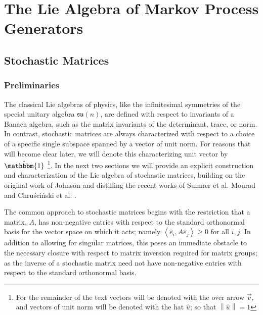 \chapter{The Lie Algebra of Markov Process Generators}
\section{Stochastic Matrices}
\subsection{Preliminaries}
The classical Lie algebras of physics, like the infinitesimal symmetries of the special
unitary algebra $\mathfrak{su}(n)$, are defined with respect to invariants of a Banach
algebra, such as the matrix invariants of the determinant, trace, or norm. In contrast,
stochastic matrices are always characterized with respect to a choice of a specific single
subspace spanned by a vector of unit norm. For reasons that will become clear later, we will
denote this characterizing unit vector by $\hat{\mathbbm{1}}$
\footnote{For the remainder of the text vectors will be denoted with the over arrow $\vec{v}$, and vectors of unit norm will be denoted with the hat $\hat{u}$; so that $\left\| \hat{u} \right\| = 1$}. In the next two sections we 
will provide an explicit construction and characterization of the Lie algebra of stochastic 
matrices, building on the original work of Johnson \cite{johnson_markov-type_1985} and
distilling the recent works of Sumner et al. \cite{sumner_lie_2012,fernandez-sanchez_lie_2012} 
Mourad \cite{mourad_lie-theoretic_2004} and Chruściński et al. \cite{chruscinski_pseudo-stochastic_2015}.

The common approach to stochastic matrices begins with the restriction that a matrix, $A$,
has non-negative entries with respect to the standard orthonormal basis for the vector
space on which it acts; namely $\left\langle\hat{e}_i,A \hat{e}_j\right\rangle \ge 0$ for 
all $i,j$. In addition to allowing for singular matrices, this poses an immediate obstacle
to the necessary closure with respect to matrix inversion required for matrix groups; as the
inverse of a stochastic matrix need not have non-negative entries with respect to the
standard orthonormal basis. 

